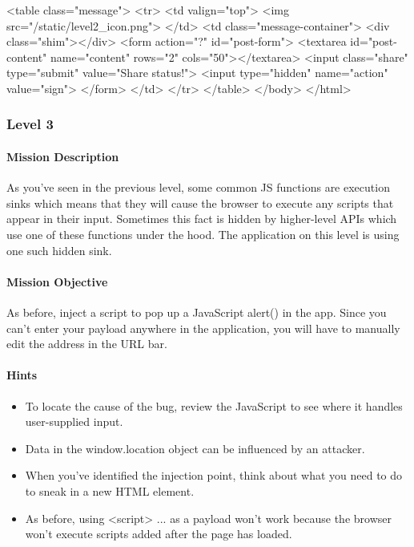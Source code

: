 \begin{Exercise}[label={websec-xss-game}]
\begin{html}
  <table class="message">
  <tr>
  <td valign="top">
  <img src="/static/level2_icon.png">
  </td>
  <td class="message-container">
  <div class="shim"></div>
  <form action="?" id="post-form">
  <textarea id="post-content" name="content" rows="2"
  cols="50"></textarea>
  <input class="share" type="submit" value="Share status!">
  <input type="hidden" name="action" value="sign">
  </form>
  </td>
  </tr>
  </table>
  </body>
</html>
\end{html}

\subsubsection{Level 3}
\paragraph{Mission Description}
As you've seen in the previous level, some common JS functions are execution sinks which means that they will cause the browser to execute any scripts that appear in their input. Sometimes this fact is hidden by higher-level APIs which use one of these functions under the hood. The application on this level is using one such hidden sink.
	
\paragraph{Mission Objective}
As before, inject a script to pop up a JavaScript alert() in the app. 
Since you can't enter your payload anywhere in the application, you will have to manually edit the address in the URL bar.

\paragraph{Hints}
\begin{itemize}
\item To locate the cause of the bug, review the JavaScript to see where it handles user-supplied input.
\item Data in the window.location object can be influenced by an attacker.
\item When you've identified the injection point, think about what you need to do to sneak in a new HTML element.
\item As before, using <script> ... as a payload won't work because the browser won't execute scripts added after the page has loaded.
\end{itemize}


\end{Exercise}
